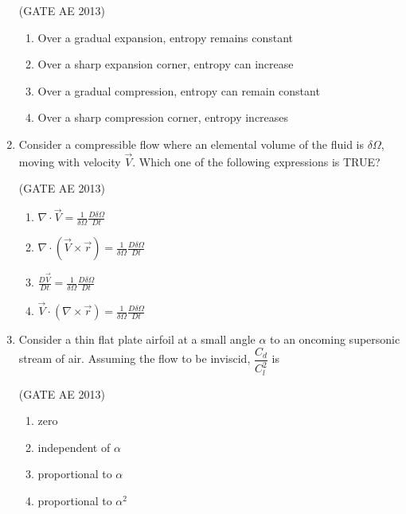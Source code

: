 \documentclass[journal,12pt,onecolumn]{IEEEtran}
\theoremstyle{remark}
\begin{document}
\begin{flushleft}
\begin{enumerate}
\hfill(GATE AE 2013)

\begin{enumerate}
    \item Over a gradual expansion, entropy remains constant
    \item Over a sharp expansion corner, entropy can increase
    \item Over a gradual compression, entropy can remain constant
    \item Over a sharp compression corner, entropy increases
\end{enumerate}

\item Consider a compressible flow where an elemental volume of the fluid is $\delta \Omega$, moving with velocity $\vec{V}$. Which one of the following expressions is TRUE? \underline{\hspace{3cm}}

\hfill(GATE AE 2013)

\begin{enumerate}
    \item $\nabla \cdot \vec{V} = \frac{1}{\delta \Omega} \frac{D \delta \Omega}{Dt}$
    \item $\nabla \cdot (\vec{V} \times \vec{r}) = \frac{1}{\delta \Omega} \frac{D \delta \Omega}{Dt}$
    \item $\frac{D \vec{V}}{Dt} = \frac{1}{\delta \Omega} \frac{D \delta \Omega}{Dt}$
    \item $\vec{V} \cdot (\nabla \times \vec{r}) = \frac{1}{\delta \Omega} \frac{D \delta \Omega}{Dt}$
\end{enumerate}

\item Consider a thin flat plate airfoil at a small angle $\alpha$ to an oncoming supersonic stream of air. Assuming the flow to be inviscid, $\dfrac{C_d}{C_l^2}$ is \underline{\hspace{3cm}}

\hfill(GATE AE 2013)

\begin{multicols}{2}
\begin{enumerate}
    \item zero
    \item independent of $\alpha$
    \item proportional to $\alpha$
    \item proportional to $\alpha^2$
\end{enumerate}
\end{multicols}


\end{enumerate}
\end{flushleft}
\end{document}

